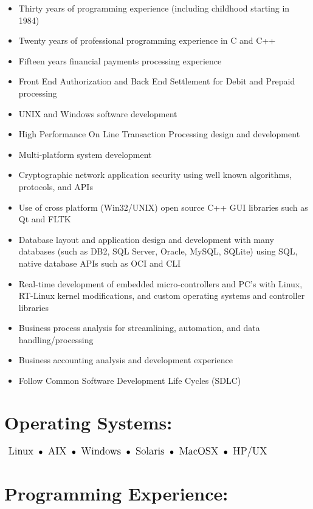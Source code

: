 \documentclass[10pt]{report}
\begin{document}
\begin{itemize}

\item Thirty years of programming experience (including childhood starting in 1984)
\item Twenty years of professional programming experience in C and C++
\item Fifteen years financial payments processing experience
\item Front End Authorization and Back End Settlement for Debit and Prepaid processing
\item UNIX and Windows software development
\item High Performance On Line Transaction Processing design and development
\item Multi-platform system development
\item Cryptographic network application security using well known algorithms, protocols, and APIs
\item Use of cross platform (Win32/UNIX) open source C++ GUI libraries such as Qt and FLTK
\item Database layout and application design and development with many databases (such as DB2, SQL Server, Oracle, MySQL, SQLite) using SQL, native database APIs such as OCI and CLI
\item Real-time development of embedded micro-controllers and PC’s with Linux, RT-Linux kernel modifications, and custom operating systems and controller libraries
\item Business process analysis for streamlining, automation, and data handling/processing
\item Business accounting analysis and development experience
\item Follow Common Software Development Life Cycles (SDLC)
\end{itemize}


\section*{Operating Systems:}

\begin{math}
\large
\textrm{ Linux }
\bullet \space \textrm{ AIX } \space
\bullet \space \textrm{ Windows } \space
\bullet \space \textrm{ Solaris } \space
\bullet \space \textrm{ MacOSX } \space
\bullet \space \textrm{ HP/UX }
\end{math}

\section*{Programming Experience:}
\end{document}

